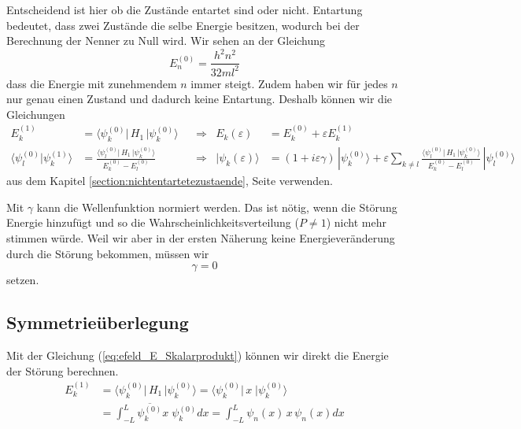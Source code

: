 \begin{refsection}
Entscheidend ist hier ob die Zust\"ande entartet sind oder nicht.
Entartung bedeutet, dass zwei Zust\"ande die selbe Energie besitzen, 
wodurch bei der Berechnung der Nenner zu Null wird.
Wir sehen an der Gleichung
\[
  E_n^{(0)} = \frac{h^2n^2}{32ml^2}
\]
dass die Energie mit zunehmendem $n$ immer steigt. 
Zudem haben wir f\"ur jedes $n$ nur genau einen Zustand und dadurch keine Entartung. 
Deshalb k\"onnen wir die Gleichungen
\begin{equation}
\begin{aligned}
\label{eq:efeld_E_Skalarprodukt}
E_k^{(1)} &=
\langle \psi_k^{(0)}|\, H_1 \,|\psi_k^{(0)}\rangle
&&\Longrightarrow
& E_k(\varepsilon)&=E_k^{(0)} + \varepsilon E_k^{(1)}
\\
\langle\psi_l^{(0)}|\psi_k^{(1)}\rangle
&=
\frac{\langle \psi_l^{(0)}|\, H_1 \,|\psi_k^{(0)}\rangle}{E_k^{(0)}-E_l^{(0)}}
&&\Longrightarrow
& |\psi_k(\varepsilon)\rangle &=
(1+i\varepsilon \gamma)
\,|\psi_k^{(0)}\rangle
+
\varepsilon
\sum_{k\ne l}
\frac{\langle \psi_l^{(0)}|\, H_1 \,|\psi_k^{(0)}\rangle}{E_k^{(0)}-E_l^{(0)}}
\,
|\psi_l^{(0)}\rangle
\end{aligned}
\end{equation}
aus dem Kapitel \ref{section:nichtentartetezustaende}, Seite \pageref{section:nichtentartetezustaende} verwenden.

Mit $\gamma$ kann die Wellenfunktion normiert werden.
Das ist n\"otig, wenn die St\"orung Energie hinzuf\"ugt
und so die Wahrscheinlichkeitsverteilung ($P \ne 1$) nicht mehr stimmen w\"urde.
Weil wir aber in der ersten N\"aherung keine 
Energiever\"anderung durch die St\"orung bekommen, m\"ussen wir
\begin{equation}
  \label{eq:efeld_gamma}
  \gamma = 0
\end{equation}
setzen.




\subsection{Symmetrie\"uberlegung}
Mit der Gleichung (\ref{eq:efeld_E_Skalarprodukt}) k\"onnen wir direkt die Energie der St\"orung berechnen.
\begin{equation}
\begin{aligned}
  E_{k}^{(1)} 
 &= \langle \psi_k^{(0)}|\, H_1 \,|\psi_k^{(0)}\rangle 
  = \langle \psi_k^{(0)}|\, x \;|\psi_k^{(0)}\rangle                   \\
 &= \int_{-L}^{L} \overline{\psi_k^{(0)}} x \; \psi_k^{(0)} dx
  = \int_{-L}^{L} \psi_n(x) \, x \, \psi_n(x) dx
\end{aligned}
\end{equation}


\end{refsection}
